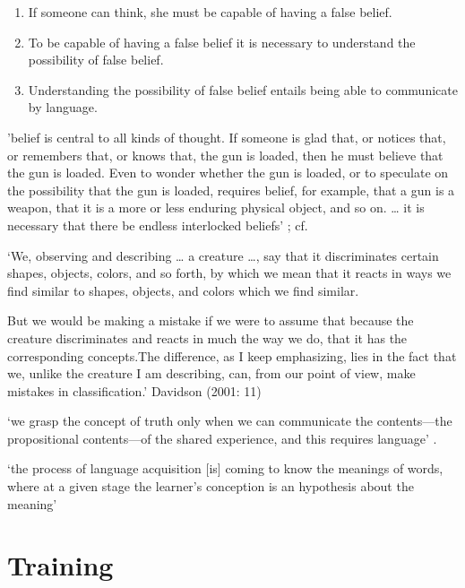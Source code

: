 \documentclass[12pt]{extarticle}
\begin{document}
\begin{multicols}{3}
\begin{enumerate}
\item
 
If someone can think, she must be capable of having a false belief.
 
\item
 
To be capable of having a false belief it is necessary to understand the possibility of false belief.
 
\item
 
Understanding the possibility of false belief entails being able to communicate by language.
 
\end{enumerate}
 
'belief is central to all kinds of thought. If someone is glad that, or notices that, or remembers that, or knows that, the gun is loaded, then he must believe that the gun is loaded. Even to wonder whether the gun is loaded, or to speculate on the possibility that the gun is loaded, requires belief, for example, that a gun is a weapon, that it is a more or less enduring physical object, and so on. … it is necessary that there be endless interlocked beliefs'
\citep[p.\ 157]{Davidson:1975eq}; cf. \citep[pp.\ 320--1]{Davidson:1982je}
 
‘We, observing and describing … a creature …, say that it discriminates certain shapes, objects, colors, and so forth, by which we mean that it reacts in ways we find similar to shapes, objects, and colors which we find similar.

But we would be making a mistake if we were to assume that because the creature discriminates and reacts in much the way we do, that it has the corresponding concepts.The difference, as I keep emphasizing, lies in the fact that we, unlike the creature I am describing, can, from our point of view, make mistakes in classification.’
Davidson (2001: 11)

\citep[p.\ 11]{Davidson:2001np}
 
‘we grasp the concept of truth only when we can communicate the contents---the propositional contents---of the shared experience, and this requires language’
\citep[p.\ 27]{Davidson:1997wj}.
 
‘the process of language acquisition [is] coming to know the meanings of words, where at a given stage the learner’s conception is an hypothesis about the meaning’
\citep[p.\ 153]{Higginbotham:1998rm}
 
 
 
\section{Training}
 

\end{multicols}
\end{document}
